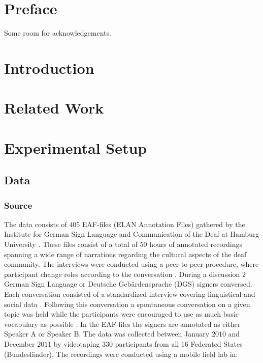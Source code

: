 
\section*{Preface}
Some room for acknowledgements.


\begin{abstract}

\end{abstract}

\section{Introduction}



\section{Related Work}



\section{Experimental Setup}



\subsection{Data}
\hfill
\subsubsection{Source}

The data consists of $405$ EAF-files (ELAN Annotation Files) gathered by the Institute for German Sign Language and Communication of the Deaf at Hamburg University \cite{prillwitz2008dgs}. These files consist of a total of $50$ hours of annotated recordings spanning a wide range of narrations regarding the cultural aspects of the deaf community. The interviews were conducted using a peer-to-peer procedure, where participant change roles according to the conversation \cite{prillwitz2008dgs}. During a discussion $2$ German Sign Language or Deutsche Gebärdensprache (DGS) signers conversed. Each conversation consisted of a standardized interview covering linguistical and social data \cite{deaf_areas}. Following this conversation a spontaneous conversation on a given topic was held while the participants were encouraged to use as much basic vocabulary as possible \cite{deaf_areas}. In the EAF-files the signers are annotated as either Speaker A or Speaker B. The data was collected between January $2010$ and December $2011$  by videotaping $330$ participants from all $16$ Federated States (Bundesländer). The recordings were conducted using a mobile field lab in:

